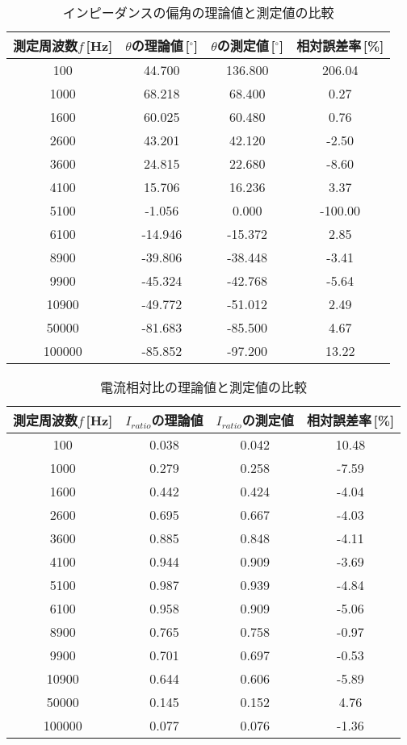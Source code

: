 \begin{table}[H]
    \centering
    \caption{インピーダンスの偏角の理論値と測定値の比較}
    \begin{tabular}{c|cc|c}
    \hline
        測定周波数$f$\,[Hz] & $\theta$の理論値\,[$^\circ$] & $\theta$の測定値\,[$^\circ$] & 相対誤差率\,[\%] \\ \hline
        100 & 44.700 & 136.800 & 206.04 \\
        1000 & 68.218 & 68.400 & 0.27 \\ 
        1600 & 60.025 & 60.480 & 0.76 \\ 
        2600 & 43.201 & 42.120 & -2.50 \\ 
        3600 & 24.815 & 22.680 & -8.60 \\ 
        4100 & 15.706 & 16.236 & 3.37 \\ 
        5100 & -1.056 & 0.000 & -100.00 \\ 
        6100 & -14.946 & -15.372 & 2.85 \\ 
        8900 & -39.806 & -38.448 & -3.41 \\ 
        9900 & -45.324 & -42.768 & -5.64 \\ 
        10900 & -49.772 & -51.012 & 2.49 \\ 
        50000 & -81.683 & -85.500 & 4.67 \\ 
        100000 & -85.852 & -97.200 & 13.22 \\ \hline
    \end{tabular}
\end{table}

\begin{table}[H]
    \centering
    \caption{電流相対比の理論値と測定値の比較}
    \begin{tabular}{c|cc|c}
    \hline
        測定周波数$f$\,[Hz] & $I_{ratio}$の理論値 & $I_{ratio}$の測定値 & 相対誤差率\,[\%] \\ \hline
        100 & 0.038 & 0.042 & 10.48 \\ 
        1000 & 0.279 & 0.258 & -7.59 \\ 
        1600 & 0.442 & 0.424 & -4.04 \\ 
        2600 & 0.695 & 0.667 & -4.03 \\ 
        3600 & 0.885 & 0.848 & -4.11 \\ 
        4100 & 0.944 & 0.909 & -3.69 \\ 
        5100 & 0.987 & 0.939 & -4.84 \\ 
        6100 & 0.958 & 0.909 & -5.06 \\ 
        8900 & 0.765 & 0.758 & -0.97 \\ 
        9900 & 0.701 & 0.697 & -0.53 \\ 
        10900 & 0.644 & 0.606 & -5.89 \\ 
        50000 & 0.145 & 0.152 & 4.76 \\ 
        100000 & 0.077 & 0.076 & -1.36 \\ \hline
    \end{tabular}
\end{table}

